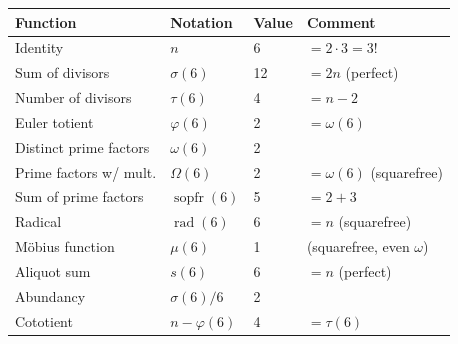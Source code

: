 \documentclass{article}
\newcommand{\rad}{\operatorname{rad}}
\newcommand{\sopfr}{\operatorname{sopfr}}
\begin{document}
\begin{center}
\begin{tabular}{llll}
\toprule
Function & Notation & Value & Comment \\
\midrule
Identity & $n$ & 6 & $= 2 \cdot 3 = 3!$ \\
Sum of divisors & $\sigma(6)$ & 12 & $= 2n$ (perfect) \\
Number of divisors & $\tau(6)$ & 4 & $= n - 2$ \\
Euler totient & $\varphi(6)$ & 2 & $= \omega(6)$ \\
Distinct prime factors & $\omega(6)$ & 2 & \\
Prime factors w/ mult. & $\Omega(6)$ & 2 & $= \omega(6)$ (squarefree) \\
Sum of prime factors & $\sopfr(6)$ & 5 & $= 2 + 3$ \\
Radical & $\rad(6)$ & 6 & $= n$ (squarefree) \\
M\"obius function & $\mu(6)$ & 1 & (squarefree, even $\omega$) \\
Aliquot sum & $s(6)$ & 6 & $= n$ (perfect) \\
Abundancy & $\sigma(6)/6$ & 2 & \\
Cototient & $n - \varphi(6)$ & 4 & $= \tau(6)$ \\
\bottomrule
\end{tabular}
\end{center}
\end{document}

